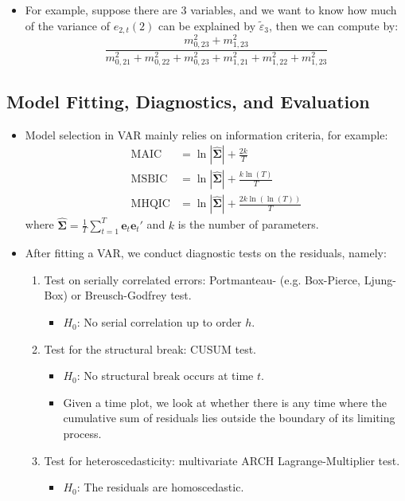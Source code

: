 \documentclass[notitlepage]{article}
\begin{document}
\begin{itemize}
    \item For example, suppose there are 3 variables, and we want to know how much of the variance of \(e_{2,t}(2)\) can be explained by \(\tilde{\varepsilon}_{3}\), then we can compute by:
    \[
    \frac{m_{0,23}^2 + m_{1,23}^2}{m_{0,21}^2 + m_{0,22}^2 + m_{0,23}^2 + m_{1,21}^2 + m_{1,22}^2 + m_{1,23}^2}
    \]
    
\end{itemize}

\subsection{Model Fitting, Diagnostics, and Evaluation}

\begin{itemize}
    \item Model selection in VAR mainly relies on information criteria, for example:
    \begin{align*}
        \text{MAIC} &= \ln|\hat{\boldsymbol{\Sigma}}| + \frac{2k}{T} \\
        \text{MSBIC} &= \ln|\hat{\boldsymbol{\Sigma}}| + \frac{k \ln(T)}{T} \\
        \text{MHQIC} &= \ln|\hat{\boldsymbol{\Sigma}}| + \frac{2k\ln(\ln(T))}{T}
    \end{align*}
    where \(\hat{\boldsymbol{\Sigma}} = \frac{1}{T}\sum_{t=1}^T \mathbf{e}_t\mathbf{e}_t'\) and \(k\) is the number of parameters.

    \item After fitting a VAR, we conduct diagnostic tests on the residuals, namely:

\begin{enumerate}
    \item Test on serially correlated errors: Portmanteau- (e.g. Box-Pierce, Ljung-Box) or Breusch-Godfrey test.
    \begin{itemize}
        \item \(H_0\): No serial correlation up to order \(h\).
    \end{itemize}
    \item Test for the structural break: CUSUM test.
    \begin{itemize}
        \item \(H_0\): No structural break occurs at time \(t\).
        \item Given a time plot, we look at whether there is any time where the cumulative sum of residuals lies outside the boundary of its limiting process.
    \end{itemize}
    \item Test for heteroscedasticity: multivariate ARCH Lagrange-Multiplier test.
    \begin{itemize}
        \item \(H_0\): The residuals are homoscedastic.
    \end{itemize}
\end{enumerate}


\end{itemize}
\end{document}
